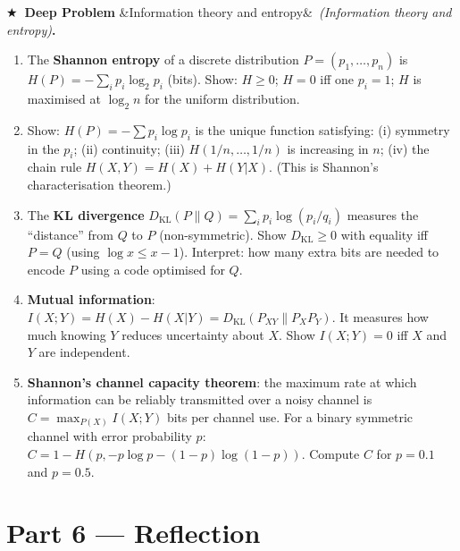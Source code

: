 \documentclass[12pt, a4paper]{article}
\newcounter{problem}
\newcounter{deepproblem}
\newenvironment{deepproblem}[1][]{%
  \refstepcounter{deepproblem}%
  \par\vspace{6pt}%
  \noindent\textbf{\color{NavyBlue}$\bigstar$\ Deep Problem \thedeepproblem}%
  \ifx&#1&\else\ \textit{(#1)}\fi\textbf{.}\enskip
}{\par\vspace{4pt}}
\begin{document}
\begin{deepproblem}[Information theory and entropy]
\begin{enumerate}[label=(\alph*)]
  \item The \textbf{Shannon entropy} of a discrete distribution $P=(p_1,\ldots,p_n)$ is $H(P)=-\sum_i p_i\log_2 p_i$ (bits). Show: $H\geq 0$; $H=0$ iff one $p_i=1$; $H$ is maximised at $\log_2 n$ for the uniform distribution.
  \item Show: $H(P)=-\sum p_i\log p_i$ is the unique function satisfying: (i) symmetry in the $p_i$; (ii) continuity; (iii) $H(1/n,\ldots,1/n)$ is increasing in $n$; (iv) the chain rule $H(X,Y)=H(X)+H(Y|X)$. (This is Shannon's characterisation theorem.)
  \item The \textbf{KL divergence} $D_{\text{KL}}(P\|Q) = \sum_i p_i\log(p_i/q_i)$ measures the ``distance'' from $Q$ to $P$ (non-symmetric). Show $D_{\text{KL}}\geq 0$ with equality iff $P=Q$ (using $\log x\leq x-1$). Interpret: how many extra bits are needed to encode $P$ using a code optimised for $Q$.
  \item \textbf{Mutual information}: $I(X;Y)=H(X)-H(X|Y)=D_{\text{KL}}(P_{XY}\|P_X P_Y)$. It measures how much knowing $Y$ reduces uncertainty about $X$. Show $I(X;Y)=0$ iff $X$ and $Y$ are independent.
  \item \textbf{Shannon's channel capacity theorem}: the maximum rate at which information can be reliably transmitted over a noisy channel is $C=\max_{P(X)}I(X;Y)$ bits per channel use. For a binary symmetric channel with error probability $p$: $C=1-H(p,-p\log p-(1-p)\log(1-p))$. Compute $C$ for $p=0.1$ and $p=0.5$.
\end{enumerate}
\end{deepproblem}

\section{Part 6 \texorpdfstring{---}{--} Reflection}
\end{document}
